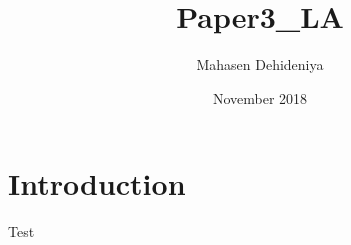 \documentclass{article}
\title{Paper3_LA}
\author{Mahasen Dehideniya}
\date{November 2018}
\begin{document}
\maketitle

\section{Introduction}
Test
\end{document}
